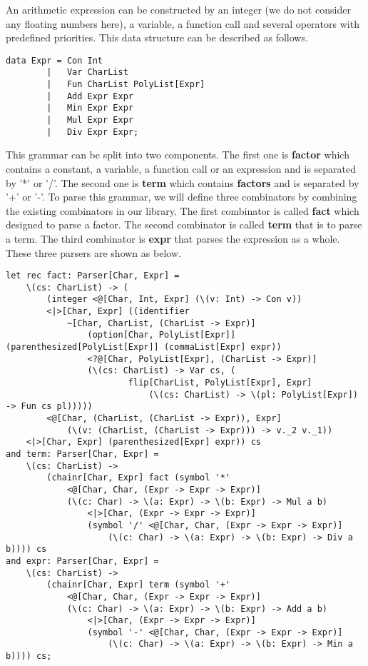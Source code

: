 An arithmetic expression can be constructed by an integer (we do not consider any floating numbers here), a variable, a function call and several operators with predefined priorities. This data structure can be described as follows.
\begin{lstlisting}
data Expr = Con Int
        |   Var CharList
        |   Fun CharList PolyList[Expr]
        |   Add Expr Expr
        |   Min Expr Expr
        |   Mul Expr Expr
        |   Div Expr Expr;
\end{lstlisting}
This grammar can be split into two components. The first one is \textbf{factor} which contains a constant, a variable, a function call or an expression and is separated by '*' or '/'.  The second one is \textbf{term} which contains \textbf{factors} and is separated by '+' or '-'.
To parse this grammar, we will define three combinators by combining the existing combinators in our library. The first combinator is called \textbf{fact} which designed to parse a factor. The second combinator is called \textbf{term} that is to parse a term. The third combinator is \textbf{expr} that parses the expression as a whole. These three parsers are shown as below.
\begin{lstlisting}
let rec fact: Parser[Char, Expr] =
	\(cs: CharList) -> (
		(integer <@[Char, Int, Expr] (\(v: Int) -> Con v))
		<|>[Char, Expr] ((identifier 
			~[Char, CharList, (CharList -> Expr)]
				(option[Char, PolyList[Expr]] (parenthesized[PolyList[Expr]] (commaList[Expr] expr))
			 	<?@[Char, PolyList[Expr], (CharList -> Expr)] 
			 	(\(cs: CharList) -> Var cs, (
			 			flip[CharList, PolyList[Expr], Expr] 
			 				(\(cs: CharList) -> \(pl: PolyList[Expr]) -> Fun cs pl)))))
		<@[Char, (CharList, (CharList -> Expr)), Expr] 
			(\(v: (CharList, (CharList -> Expr))) -> v._2 v._1))
	<|>[Char, Expr] (parenthesized[Expr] expr)) cs
and term: Parser[Char, Expr] = 
	\(cs: CharList) -> 
		(chainr[Char, Expr] fact (symbol '*' 
			<@[Char, Char, (Expr -> Expr -> Expr)] 
			(\(c: Char) -> \(a: Expr) -> \(b: Expr) -> Mul a b)
				<|>[Char, (Expr -> Expr -> Expr)] 
				(symbol '/' <@[Char, Char, (Expr -> Expr -> Expr)] 
					(\(c: Char) -> \(a: Expr) -> \(b: Expr) -> Div a b)))) cs
and expr: Parser[Char, Expr] = 
	\(cs: CharList) -> 
		(chainr[Char, Expr] term (symbol '+' 
			<@[Char, Char, (Expr -> Expr -> Expr)] 
			(\(c: Char) -> \(a: Expr) -> \(b: Expr) -> Add a b)
				<|>[Char, (Expr -> Expr -> Expr)] 
				(symbol '-' <@[Char, Char, (Expr -> Expr -> Expr)] 
					(\(c: Char) -> \(a: Expr) -> \(b: Expr) -> Min a b)))) cs;
\end{lstlisting}

